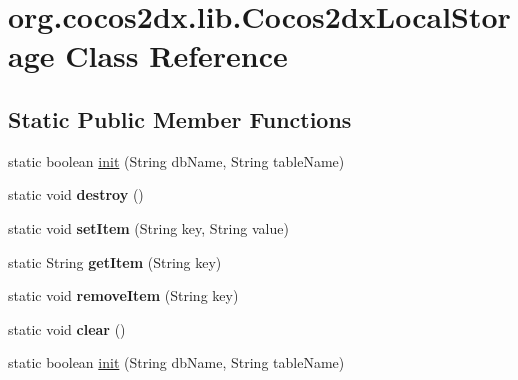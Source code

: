 \hypertarget{classorg_1_1cocos2dx_1_1lib_1_1Cocos2dxLocalStorage}{}\section{org.\+cocos2dx.\+lib.\+Cocos2dx\+Local\+Storage Class Reference}
\label{classorg_1_1cocos2dx_1_1lib_1_1Cocos2dxLocalStorage}
\subsection*{Static Public Member Functions}
\begin{DoxyCompactItemize}
\item 
static boolean \hyperlink{classorg_1_1cocos2dx_1_1lib_1_1Cocos2dxLocalStorage_ac878c872715e26f8848749cdd8b0cede}{init} (String db\+Name, String table\+Name)
\item 
\mbox{\label{classorg_1_1cocos2dx_1_1lib_1_1Cocos2dxLocalStorage_a0159096cc6277723e7541cf657dd3199}} 
static void {\bfseries destroy} ()
\item 
\mbox{\label{classorg_1_1cocos2dx_1_1lib_1_1Cocos2dxLocalStorage_aa34d7d08c3fb172f4bacb6d7b043f411}} 
static void {\bfseries set\+Item} (String key, String value)
\item 
\mbox{\label{classorg_1_1cocos2dx_1_1lib_1_1Cocos2dxLocalStorage_afacdcae2a03124bded4397b2cd7b73ac}} 
static String {\bfseries get\+Item} (String key)
\item 
\mbox{\label{classorg_1_1cocos2dx_1_1lib_1_1Cocos2dxLocalStorage_ad36406f2809f5871b596fc40504199e1}} 
static void {\bfseries remove\+Item} (String key)
\item 
\mbox{\label{classorg_1_1cocos2dx_1_1lib_1_1Cocos2dxLocalStorage_aa82c6329449049025e9ead4ea7e920de}} 
static void {\bfseries clear} ()
\item 
static boolean \hyperlink{classorg_1_1cocos2dx_1_1lib_1_1Cocos2dxLocalStorage_ac878c872715e26f8848749cdd8b0cede}{init} (String db\+Name, String table\+Name)

\end{DoxyCompactItemize}

